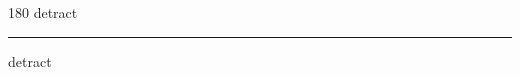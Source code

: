 
\begin{frame}
\begin{center}
\begin{turn}{180}
{\fontsize{2.5cm}{1em}\selectfont detract}
\end{turn}
\vspace{1em}\par  
\hrule
\vspace{1em}\par  
{\fontsize{2.5cm}{1em}\selectfont detract}
\end{center}
\end{frame}

